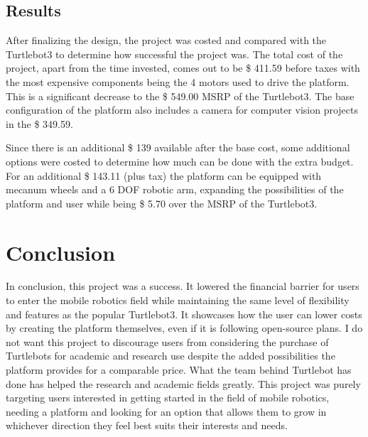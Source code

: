 \documentclass[12pt, letterpaper,titlepage]{article}
\begin{document}
\subsection{Results}
	After finalizing the design, the project was costed and compared with the Turtlebot3 to determine how successful the project was. The total cost of the project, apart from the time invested, comes out to be \$ 411.59 before taxes with the most expensive components being the 4 motors used to drive the platform. This is a significant decrease to the \$ 549.00 MSRP of the Turtlebot3. The base configuration of the platform also includes a camera for computer vision projects in the \$ 349.59. 

	Since there is an additional \$ 139 available after the base cost, some additional options were costed to determine how much can be done with the extra budget. For an additional \$ 143.11 (plus tax) the platform can be equipped with mecanum wheels and a 6 DOF robotic arm, expanding the possibilities of the platform and user while being \$ 5.70 over the MSRP of the Turtlebot3.

\section{Conclusion}
	In conclusion, this project was a success. It lowered the financial barrier for users to enter the mobile robotics field while maintaining the same level of flexibility and features as the popular Turtlebot3. It showcases how the user can lower costs by creating the platform themselves, even if it is following open-source plans. I do not want this project to discourage users from considering the purchase of Turtlebots for academic and research use despite the added possibilities the platform provides for a comparable price. What the team behind Turtlebot has done has helped the research and academic fields greatly. This project was purely targeting users interested in getting started in the field of mobile robotics, needing a platform and looking for an option that allows them to grow in whichever direction they feel best suits their interests and needs.



\end{document}
